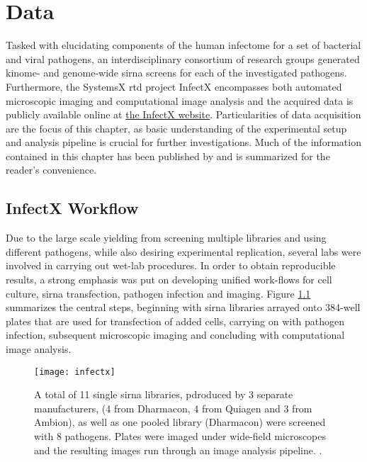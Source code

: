 \chapter{Data}

Tasked with elucidating components of the human infectome for a set of bacterial and viral pathogens, an interdisciplinary consortium of research groups generated kinome- and genome-wide \gls{sirna} screens for each of the investigated pathogens. Furthermore, the SystemsX \gls{rtd} project InfectX encompasses both automated microscopic imaging and computational image analysis and the acquired data is publicly available online at \href{http://www.infectx.ch/databrowser}{the InfectX website}. Particularities of data acquisition are the focus of this chapter, as basic understanding of the experimental setup and analysis pipeline is crucial for further investigations. Much of the information contained in this chapter has been published by \cite{Ramo2014} and is summarized for the reader's convenience.

\section{InfectX Workflow}
Due to the large scale yielding from screening multiple libraries and using different pathogens, while also desiring experimental replication, several labs were involved in carrying out wet-lab procedures. In order to obtain reproducible results, a strong emphasis was put on developing unified work-flows for cell culture, \gls{sirna} transfection, pathogen infection and imaging. Figure \ref{fig:infectx} summarizes the central steps, beginning with \gls{sirna} libraries arrayed onto 384-well plates that are used for transfection of added cells, carrying on with pathogen infection, subsequent microscopic imaging and concluding with computational image analysis.

\begin{figure}
  \centering
  \texttt{[image: infectx]}
  \caption[InfectX RNAi data acquisition and analysis workflow.]{A total of 11 single \gls{sirna} libraries, pdroduced by 3 separate manufacturers, (4 from Dharmacon, 4 from Quiagen and 3 from Ambion), as well as one pooled library (Dharmacon) were screened with 8 pathogens. Plates were imaged under wide-field microscopes and the resulting images run through an image analysis pipeline. \citep{Ramo2014}.}
  \label{fig:infectx}
\end{figure}

